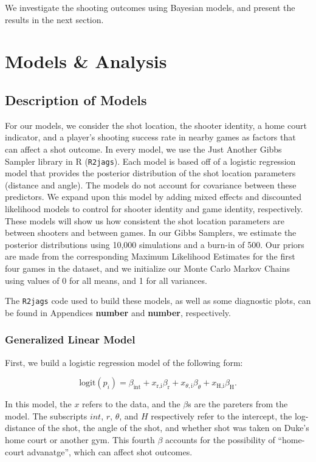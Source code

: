 \documentclass[12pt,twoside]{dukestatscithesis}
\theoremstyle{definition}
\theoremstyle{definition}
\theoremstyle{definition}
\theoremstyle{remark}
\begin{document}
We investigate the shooting outcomes using Bayesian models, and present
the results in the next section.

\chapter{Models \& Analysis}\label{models}

\section{Description of Models}\label{description-of-models}

For our models, we consider the shot location, the shooter identity, a
home court indicator, and a player's shooting success rate in nearby
games as factors that can affect a shot outcome. In every model, we use
the Just Another Gibbs Sampler library in R (\texttt{R2jags}). Each
model is based off of a logistic regression model that provides the
posterior distribution of the shot location parameters (distance and
angle). The models do not account for covariance between these
predictors. We expand upon this model by adding mixed effects and
discounted likelihood models to control for shooter identity and game
identity, respectively. These models will show us how consistent the
shot location parameters are between shooters and between games. In our
Gibbs Samplers, we estimate the posterior distributions using 10,000
simulations and a burn-in of 500. Our priors are made from the
corresponding Maximum Likelihood Estimates for the first four games in
the dataset, and we initialize our Monte Carlo Markov Chains using
values of 0 for all means, and 1 for all variances.

The \texttt{R2jags} code used to build these models, as well as some
diagnostic plots, can be found in Appendices \textbf{number} and
\textbf{number}, respectively.

\subsection{Generalized Linear Model}\label{generalized-linear-model}

First, we build a logistic regression model of the following form:

\[
\text{logit}(p_{i}) = 
\beta_{\text{int}} +
x_{\text{r,i}}\beta_{\text{r}} +
x_{\theta,\text{i}}\beta_{\theta} +
x_{\text{H,i}}\beta_{\text{H}}.
\]

In this model, the \(x\) refers to the data, and the \(\beta\)s are the
pareters from the model. The subscripts \(\textit{int}\),
\(\textit{r}\), \(\theta\), and \(\textit{H}\) respectively refer to the
intercept, the log-distance of the shot, the angle of the shot, and
whether shot was taken on Duke's home court or another gym. This fourth
\(\beta\) accounts for the possibility of ``home-court advanatge'',
which can affect shot outcomes.
\end{document}
